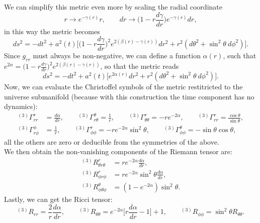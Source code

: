 We can simplify this metric even more by scaling the radial coordinate
\begin{equation*}
    r\rightarrow e^{-\gamma(r)}r,\qquad dr\rightarrow \bigg(1-r\frac{d\gamma}{dr}\bigg)e^{-\gamma(r)}dr,
\end{equation*}
in this way the metric becomes
\begin{equation*}
    ds^2=-dt^2+a^2(t)\bigg[\bigg(1-r\frac{d\gamma}{dr}\bigg)^{2}e^{2(\beta(r)-\gamma(r))}dr^2+r^2(d\theta^2+\sin^2\theta\ d\phi^2)\bigg].
\end{equation*}
Since $g_{rr}$ must always be non-negative, we can define a function $\alpha(r)$, such that $e^{2\alpha}=\big(1-r\frac{d\gamma}{dr}\big)^{2}e^{2(\beta(r)-\gamma(r))}$, so that the metric reads
\begin{equation*}
    ds^2=-dt^2+a^2(t)\big[e^{2\alpha(r)}dr^2+r^2(d\theta^2+\sin^2\theta\ d\phi^2)\big].
\end{equation*}
Now, we can evaluate the Christoffel symbols of the metric restitricted to the universe submanifold (because with this construction the time component has no dynamics):
\begin{align}\label{eq:RWL3Christoffel}
    ^{(3)}\Gamma_{rr}^r&=\frac{d\alpha}{dr},\qquad^{(3)}\Gamma_{r\theta}^\theta=\frac{1}{r},\qquad^{(3)}\Gamma_{\theta\theta}^r=-re^{-2\alpha},\qquad^{(3)}\Gamma_{rr}^r=\frac{\cos\theta}{\sin\theta},\nonumber\\
    ^{(3)}\Gamma_{r\phi}^\phi&=\frac{1}{r},\qquad^{(3)}\Gamma_{\phi\phi}^r=-re^{-2\alpha}\sin^2\theta,\qquad^{(3)}\Gamma_{\phi\phi}^\theta=-\sin\theta\cos\theta,
\end{align}
all the others are zero or deducible from the symmetries of the above.\\ We then obtain the non-vanishing components of the Riemann tensor are:
\begin{align}\label{eq:RWL3Riemann}
    ^{(3)}R^r_{\theta r\theta}&=re^{-2\alpha}\frac{d\alpha}{dr},\nonumber\\
    ^{(3)}R^r_{\phi r\phi}&=re^{-2\alpha}\sin^2\theta\frac{d\alpha}{dr},\nonumber\\
    ^{(3)}R^\theta_{\phi \theta\phi}&=(1-e^{-2\alpha})\sin^2\theta.
\end{align}
Lastly, we can get the Ricci tensor:
\begin{equation}\label{eq:RWL3Ricci}
    ^{(3)}R_{rr}=\frac{2}{r}\frac{d\alpha}{dr},\qquad ^{(3)}R_{\theta\theta}=e^{-2\alpha}\bigg[r\frac{d\alpha}{dr}-1\bigg]+1,\qquad ^{(3)}R_{\phi\phi}=\sin^2\theta R_{\theta\theta}.
\end{equation}
